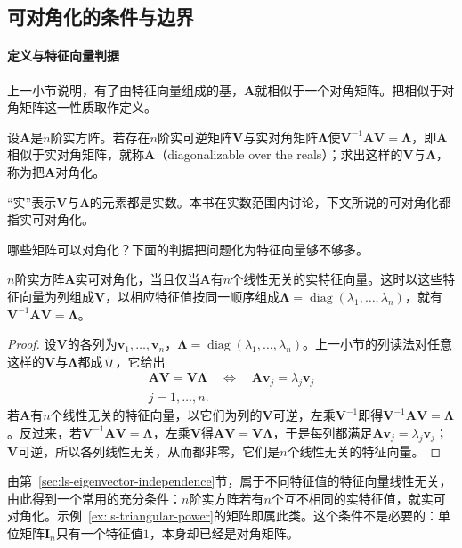 \subsection{可对角化的条件与边界}

\paragraph{定义与特征向量判据}
上一小节说明，有了由特征向量组成的基，$\bm A$就相似于一个对角矩阵。把相似于对角矩阵这一性质取作定义。
\begin{definition}[实可对角化]
\label{def:ls-real-diagonalizable}
设$\bm A$是$n$阶实方阵。若存在$n$阶实可逆矩阵$\bm V$与实对角矩阵$\bm\Lambda$使$\bm V^{-1}\bm A\bm V=\bm\Lambda$，即$\bm A$相似于实对角矩阵，就称$\bm A$（diagonalizable over the reals）；求出这样的$\bm V$与$\bm\Lambda$，称为把$\bm A$对角化。
\end{definition}
“实”表示$\bm V$与$\bm\Lambda$的元素都是实数。本书在实数范围内讨论，下文所说的可对角化都指实可对角化。

哪些矩阵可以对角化？下面的判据把问题化为特征向量够不够多。
\begin{theorem}[对角化判据]
\label{thm:ls-diagonalization-criterion}
$n$阶实方阵$\bm A$实可对角化，当且仅当$\bm A$有$n$个线性无关的实特征向量。这时以这些特征向量为列组成$\bm V$，以相应特征值按同一顺序组成$\bm\Lambda=\operatorname{diag}(\lambda_1,\ldots,\lambda_n)$，就有$\bm V^{-1}\bm A\bm V=\bm\Lambda$。
\end{theorem}
\begin{proof}
设$\bm V$的各列为$\bm v_1,\ldots,\bm v_n$，$\bm\Lambda=\operatorname{diag}(\lambda_1,\ldots,\lambda_n)$。上一小节的列读法对任意这样的$\bm V$与$\bm\Lambda$都成立，它给出
\[
 \begin{gathered}
\bm A\bm V=\bm V\bm\Lambda
 \quad\Longleftrightarrow\quad
 \bm A\bm v_j=\lambda_j\bm v_j\\
j=1,\ldots,n.
 \end{gathered}
\]
若$\bm A$有$n$个线性无关的特征向量，以它们为列的$\bm V$可逆，左乘$\bm V^{-1}$即得$\bm V^{-1}\bm A\bm V=\bm\Lambda$。反过来，若$\bm V^{-1}\bm A\bm V=\bm\Lambda$，左乘$\bm V$得$\bm A\bm V=\bm V\bm\Lambda$，于是每列都满足$\bm A\bm v_j=\lambda_j\bm v_j$；$\bm V$可逆，所以各列线性无关，从而都非零，它们是$n$个线性无关的特征向量。
\end{proof}
由第~\ref{sec:ls-eigenvector-independence}节，属于不同特征值的特征向量线性无关，由此得到一个常用的充分条件：$n$阶实方阵若有$n$个互不相同的实特征值，就实可对角化。示例~\ref{ex:ls-triangular-power}的矩阵即属此类。这个条件不是必要的：单位矩阵$\bm I_n$只有一个特征值$1$，本身却已经是对角矩阵。

